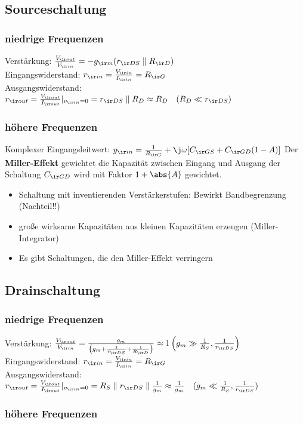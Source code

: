 \documentclass[european]{latex4ei_sheet}
\begin{document}
\begin{sectionbox}
	\subsection{Sourceschaltung}
	\subsubsection{niedrige Frequenzen}
	Verstärkung: $\frac{V_{\ir out}}{V_{\ir in}} = -g_{\ir m}(r_{\ir DS}\parallel R_{\ir D})$\\
	Eingangswiderstand: $r_{\ir in} = \frac{V_{\ir in}}{I_{\ir in}} = R_{\ir G}$\\
	Ausgangswiderstand: $r_{\ir out} = \frac{V_{\ir out}}{I_{\ir out}}|_{v_{\ir in} = 0} = r_{\ir DS}\parallel R_D \approx R_D \quad (R_D \ll r_{\ir DS})$\\
	\subsubsection{höhere Frequenzen}
	Komplexer Eingangsleitwert: $y_{\ir in} = \frac{1}{R_{\ir G}}+\j\omega[C_{\ir GS} + C_{\ir GD}(1-A)]$
	Der \textbf{Miller-Effekt} gewichtet die Kapazität zwischen Eingang und Ausgang der Schaltung $C_{\ir GD}$ wird mit Faktor $1+\abs{A}$ gewichtet.
	\begin{itemize}
		\item Schaltung mit inventierenden Verstärkerstufen: Bewirkt Bandbegrenzung (Nachteil!!)
		\item große wirksame Kapazitäten aus kleinen Kapazitäten erzeugen (Miller-Integrator)
		\item Es gibt Schaltungen, die den Miller-Effekt verringern
	\end{itemize}
\end{sectionbox}
\begin{sectionbox}
	\subsection{Drainschaltung}
	\subsubsection{niedrige Frequenzen}
		Verstärkung: $\frac{V_{\ir out}}{V_{\ir in}} = \frac{g_m}{\left(g_m+\frac{1}{r_{\ir DS}}+\frac{1}{R_{\ir D}}\right)} \approx 1 \left(g_m\gg\frac{1}{R_S}, \frac{1}{r_{\ir DS}}\right)$\\
		Eingangswiderstand: $r_{\ir in} = \frac{V_{\ir in}}{I_{\ir in}} = R_{\ir G}$\\
		Ausgangswiderstand: $r_{\ir out} = \frac{V_{\ir out}}{I_{\ir out}}|_{v_{\ir in} = 0} = R_S\parallel r_{\ir DS}\parallel \frac{1}{g_m} \approx \frac{1}{g_m} \quad (g_m\ll \frac{1}{R_S}, \frac{1}{r_{\ir DS}})$
	\subsubsection{höhere Frequenzen}
\end{sectionbox}
\end{document}
